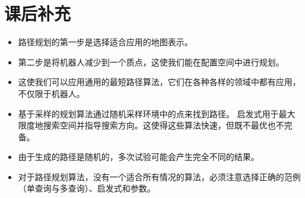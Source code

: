 \section*{课后补充}
\begin{itemize}

\item 路径规划的第一步是选择适合应用的地图表示。
\item 第二步是将机器人减少到一个质点，这使我们能在配置空间中进行规划。
\item 这使我们可以应用通用的最短路径算法，它们在各种各样的领域中都有应用，不仅限于机器人。
\item 基于采样的规划算法通过随机采样环境中的点来找到路径。 启发式用于最大限度地搜索空间并指导搜索方向。这使得这些算法快速，但既不最优也不完备。
\item 由于生成的路径是随机的，多次试验可能会产生完全不同的结果。
\item 对于路径规划算法，没有一个适合所有情况的算法，必须注意选择正确的范例（单查询与多查询）、启发式和参数。
\end{itemize}

